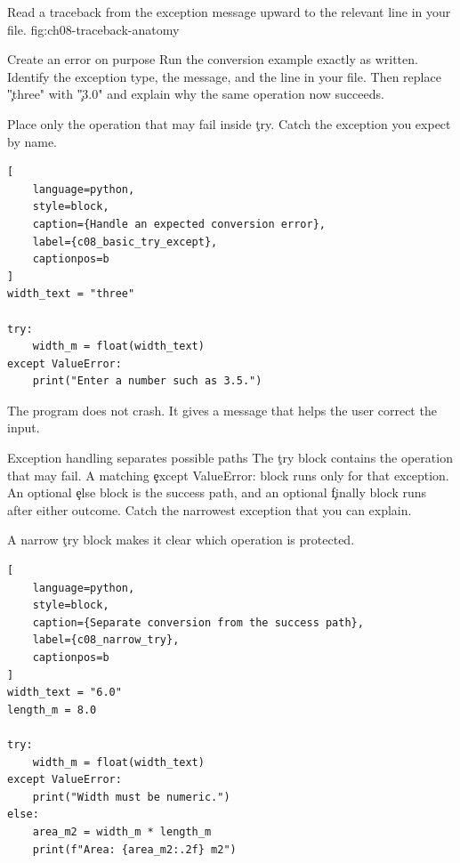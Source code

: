{Read a traceback from the exception message upward to the relevant line in your file.}
{fig:ch08-traceback-anatomy}

\begin{TryBox}{Create an error on purpose}
Run the conversion example exactly as written. Identify the exception type,
the message, and the line in your file. Then replace \c{"three"} with
\c{"3.0"} and explain why the same operation now succeeds.
\end{TryBox}


Place only the operation that may fail inside \c{try}. Catch the exception you
expect by name.

\begin{lstlisting}[
    language=python,
    style=block,
    caption={Handle an expected conversion error},
    label={c08_basic_try_except},
    captionpos=b
]
width_text = "three"

try:
    width_m = float(width_text)
except ValueError:
    print("Enter a number such as 3.5.")
\end{lstlisting}

The program does not crash. It gives a message that helps the user correct the
input.

\begin{SyntaxBox}{Exception handling separates possible paths}
The \c{try} block contains the operation that may fail. A matching
\c{except ValueError:} block runs only for that exception. An optional
\c{else} block is the success path, and an optional \c{finally} block runs
after either outcome. Catch the narrowest exception that you can explain.
\end{SyntaxBox}


A narrow \c{try} block makes it clear which operation is protected.

\begin{lstlisting}[
    language=python,
    style=block,
    caption={Separate conversion from the success path},
    label={c08_narrow_try},
    captionpos=b
]
width_text = "6.0"
length_m = 8.0

try:
    width_m = float(width_text)
except ValueError:
    print("Width must be numeric.")
else:
    area_m2 = width_m * length_m
    print(f"Area: {area_m2:.2f} m2")
\end{lstlisting}

